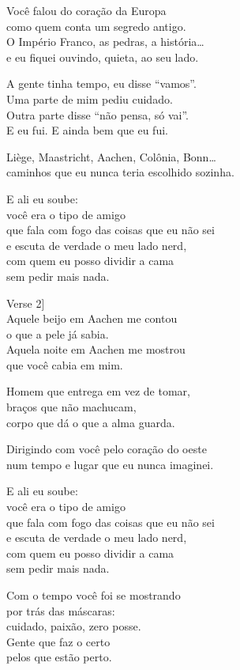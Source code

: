\begin{lyrics}
Você falou do coração da Europa\\
como quem conta um segredo antigo.\\
O Império Franco, as pedras, a história…\\
e eu fiquei ouvindo, quieta, ao seu lado.

A gente tinha tempo, eu disse “vamos”.\\
Uma parte de mim pediu cuidado.\\
Outra parte disse “não pensa, só vai”.\\
E eu fui. E ainda bem que eu fui.

Liège, Maastricht, Aachen, Colônia, Bonn…\\
caminhos que eu nunca teria escolhido sozinha.

E ali eu soube:\\
você era o tipo de amigo\\
que fala com fogo das coisas que eu não sei\\
e escuta de verdade o meu lado nerd,\\
com quem eu posso dividir a cama\\
sem pedir mais nada.

Verse 2]\\
Aquele beijo em Aachen me contou\\
o que a pele já sabia.\\
Aquela noite em Aachen me mostrou\\
que você cabia em mim.

Homem que entrega em vez de tomar,\\
braços que não machucam,\\
corpo que dá o que a alma guarda.

Dirigindo com você pelo coração do oeste\\
num tempo e lugar que eu nunca imaginei.

E ali eu soube:\\
você era o tipo de amigo\\
que fala com fogo das coisas que eu não sei\\
e escuta de verdade o meu lado nerd,\\
com quem eu posso dividir a cama\\
sem pedir mais nada.

Com o tempo você foi se mostrando\\
por trás das máscaras:\\
cuidado, paixão, zero posse.\\
Gente que faz o certo\\
pelos que estão perto.


\end{lyrics}

